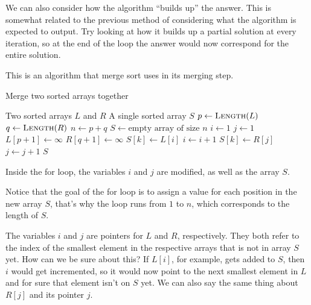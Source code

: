 We can also consider how the algorithm ``builds up'' the answer. This is somewhat related to the previous method of considering what the algorithm is expected to output. Try looking at how it builds up a partial solution at every iteration, so at the end of the loop the answer would now correspond for the entire solution.

\begin{example}
    This is an algorithm that merge sort uses in its merging step.
    \begin{algorithm}[H]
        \caption{Merge two sorted arrays together}
        \begin{algorithmic}[1]
            \Require Two sorted arrays $L$ and $R$
            \Ensure A single sorted array $S$
                \State $p \gets \text{\Call{Length}{$L$}}$
                \State $q \gets \text{\Call{Length}{$R$}}$
                \State $n \gets p + q$
                \State $S \gets \text{empty array of size $n$}$
                \State $i \gets 1$
                \State $j \gets 1$
                \State $L[p+1] \gets \infty$
                \State $R[q+1] \gets \infty$
                        \State $S[k] \gets L[i]$
                        \State $i \gets i+1$
                    \Else
                        \State $S[k] \gets R[j]$
                        \State $j \gets j+1$
                    \EndIf
                \EndFor
                \Return $S$
            \EndFunction
        \end{algorithmic}
    \end{algorithm}

    Inside the for loop, the variables $i$ and $j$ are modified, as well as the array $S$. %

    Notice that the goal of the for loop is to assign a value for each position in the new array $S$, that's why the loop runs from $1$ to $n$, which corresponds to the length of $S$. 

    The variables $i$ and $j$ are pointers for $L$ and $R$, respectively. They both refer to the index of the smallest element in the respective arrays that is not in array $S$ yet. How can we be sure about this? If $L[i]$, for example, gets added to $S$, then $i$ would get incremented, so it would now point to the next smallest element in $L$ and for sure that element isn't on $S$ yet. We can also say the same thing about $R[j]$ and its pointer $j$.

\end{example}

